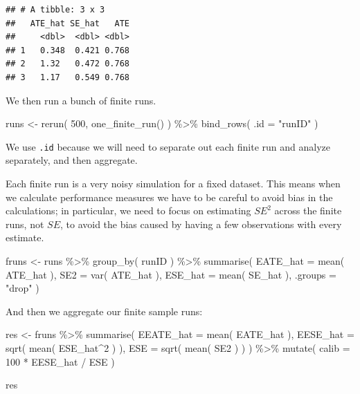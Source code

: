 \documentclass[
]{book}
\newenvironment{Shaded}{\begin{snugshade}}{\end{snugshade}}
\newcommand{\AttributeTok}[1]{\textcolor[rgb]{0.77,0.63,0.00}{#1}}
\newcommand{\DecValTok}[1]{\textcolor[rgb]{0.00,0.00,0.81}{#1}}
\newcommand{\FunctionTok}[1]{\textcolor[rgb]{0.00,0.00,0.00}{#1}}
\newcommand{\NormalTok}[1]{#1}
\newcommand{\OtherTok}[1]{\textcolor[rgb]{0.56,0.35,0.01}{#1}}
\newcommand{\SpecialCharTok}[1]{\textcolor[rgb]{0.00,0.00,0.00}{#1}}
\newcommand{\StringTok}[1]{\textcolor[rgb]{0.31,0.60,0.02}{#1}}
\begin{document}
\begin{verbatim}
## # A tibble: 3 x 3
##   ATE_hat SE_hat   ATE
##     <dbl>  <dbl> <dbl>
## 1   0.348  0.421 0.768
## 2   1.32   0.472 0.768
## 3   1.17   0.549 0.768
\end{verbatim}

We then run a bunch of finite runs.

\begin{Shaded}
\begin{Highlighting}[]
\NormalTok{runs }\OtherTok{\textless{}{-}} \FunctionTok{rerun}\NormalTok{( }\DecValTok{500}\NormalTok{, }\FunctionTok{one\_finite\_run}\NormalTok{() ) }\SpecialCharTok{\%\textgreater{}\%}
  \FunctionTok{bind\_rows}\NormalTok{( }\AttributeTok{.id =} \StringTok{"runID"}\NormalTok{ )}
\end{Highlighting}
\end{Shaded}

We use \texttt{.id} because we will need to separate out each finite run and analyze separately, and then aggregate.

Each finite run is a very noisy simulation for a fixed dataset.
This means when we calculate performance measures we have to be careful to avoid bias in the calculations; in particular, we need to focus on estimating \(SE^2\) across the finite runs, not \(SE\), to avoid the bias caused by having a few observations with every estimate.

\begin{Shaded}
\begin{Highlighting}[]
\NormalTok{fruns }\OtherTok{\textless{}{-}}\NormalTok{ runs }\SpecialCharTok{\%\textgreater{}\%} \FunctionTok{group\_by}\NormalTok{( runID ) }\SpecialCharTok{\%\textgreater{}\%}
  \FunctionTok{summarise}\NormalTok{( }\AttributeTok{EATE\_hat =} \FunctionTok{mean}\NormalTok{( ATE\_hat ),}
             \AttributeTok{SE2 =} \FunctionTok{var}\NormalTok{( ATE\_hat ),}
             \AttributeTok{ESE\_hat =} \FunctionTok{mean}\NormalTok{( SE\_hat ),}
             \AttributeTok{.groups =} \StringTok{"drop"}\NormalTok{ )}
\end{Highlighting}
\end{Shaded}

And then we aggregate our finite sample runs:

\begin{Shaded}
\begin{Highlighting}[]
\NormalTok{res }\OtherTok{\textless{}{-}}\NormalTok{ fruns }\SpecialCharTok{\%\textgreater{}\%}
  \FunctionTok{summarise}\NormalTok{( }\AttributeTok{EEATE\_hat =} \FunctionTok{mean}\NormalTok{( EATE\_hat ),}
             \AttributeTok{EESE\_hat =} \FunctionTok{sqrt}\NormalTok{( }\FunctionTok{mean}\NormalTok{( ESE\_hat}\SpecialCharTok{\^{}}\DecValTok{2}\NormalTok{ ) ),}
             \AttributeTok{ESE =} \FunctionTok{sqrt}\NormalTok{( }\FunctionTok{mean}\NormalTok{( SE2 ) ) ) }\SpecialCharTok{\%\textgreater{}\%}
  \FunctionTok{mutate}\NormalTok{( }\AttributeTok{calib =} \DecValTok{100} \SpecialCharTok{*}\NormalTok{ EESE\_hat }\SpecialCharTok{/}\NormalTok{ ESE )}

\NormalTok{res}
\end{Highlighting}
\end{Shaded}
\end{document}
